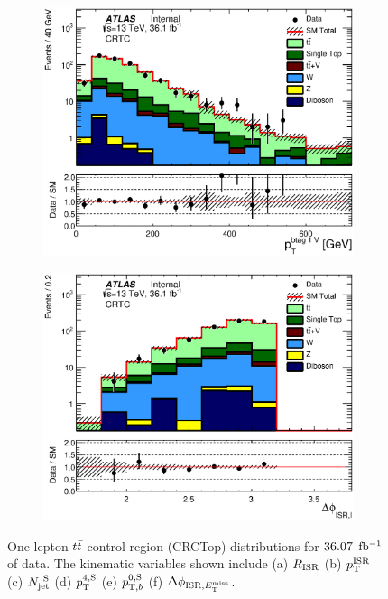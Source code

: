 \begin{figure}[h!]
\begin{subfigure}[b]{0.40\textwidth}
    \includegraphics[width=\textwidth]{figures/ttbar/postfit/CA_pTbV1_CRTopC_log}
               \caption{ }
    \end{subfigure}
            \begin{subfigure}[b]{0.40\textwidth}  
    \includegraphics[width=\textwidth]{figures/ttbar/postfit/CA_dphiISRI_CRTopC_log}
               \caption{ }
    \end{subfigure}
       \caption[One-lepton $\ttbar$ control region (CRTopC) distributions for $\intlumi$ $\ifb$ of data]{One-lepton $\ttbar$ control region (CRCTop) distributions for $\intlumi$ $\ifb$ of data.  The kinematic variables shown include (a) $R_{\mathrm{ISR}}$ (b) $p_{\mathrm{T}}^{\mathrm{ISR}}$ (c) $N_{\mathrm{jet}}^{~\mathrm{S}}$ (d) $p_{\mathrm{T}}^{4,\mathrm{S}}$ (e) $p_{\mathrm{T},b}^{0,\mathrm{S}}$ (f) $\Delta\phi_{\mathrm{ISR},E_{\mathrm{T}}^{\mathrm{miss}}}$.  } %
  \label{fig:CRTopC2}
\end{figure}

